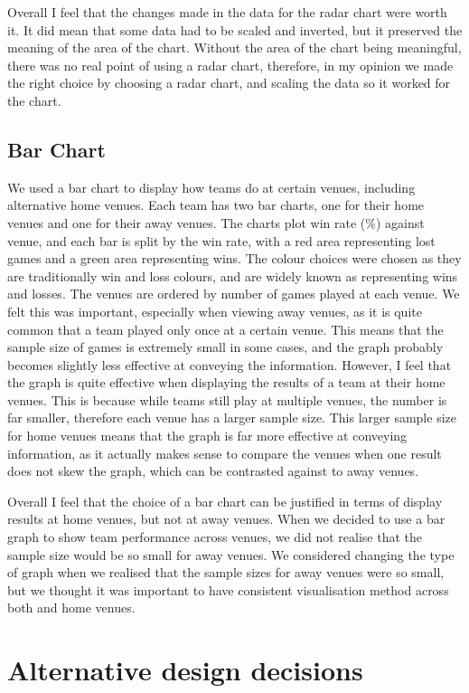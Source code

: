 \documentclass[10pt, journal]{IEEEtran}
\begin{document}
Overall I feel that the changes made in the data for the radar chart were worth it. It did mean that some data had to be scaled and inverted, but it preserved the meaning of the area of the chart. Without the area of the chart being meaningful, there was no real point of using a radar chart, therefore, in my opinion we made the right choice by choosing a radar chart, and scaling the data so it worked for the chart.

\subsection{Bar Chart}
We used a bar chart to display how teams do at certain venues, including alternative home venues. Each team has two bar charts, one for their home venues and one for their away venues. The charts plot win rate (\%) against venue, and each bar is split by the win rate, with a red area representing lost games and a green area representing wins. The colour choices were chosen as they are traditionally win and loss colours, and are widely known as representing wins and losses. The venues are ordered by number of games played at each venue. We felt this was important, especially when viewing away venues, as it is quite common that a team played only once at a certain venue. This means that the sample size of games is extremely small in some cases, and the graph probably becomes slightly less effective at conveying the information. However, I feel that the graph is quite effective when displaying the results of a team at their home venues. This is because while teams still play at multiple venues, the number is far smaller, therefore each venue has a larger sample size. This larger sample size for home venues means that the graph is far more effective at conveying information, as it actually makes sense to compare the venues when one result does not skew the graph, which can be contrasted against to away venues. 

Overall I feel that the choice of a bar chart can be justified in terms of display results at home venues, but not at away venues. When we decided to use a bar graph to show team performance across venues, we did not realise that the sample size would be so small for away venues. We considered changing the type of graph when we realised that the sample sizes for away venues were so small, but we thought it was important to have consistent visualisation method across both and home venues.

\section{Alternative design decisions} 
\end{document}
